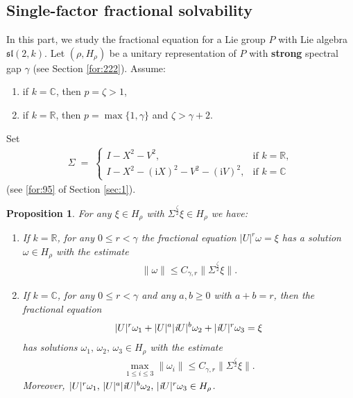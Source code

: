 \documentclass[11 pt]{amsart}
\newcommand{\RR}{\mathbb{R}}
\newcommand{\CC}{\mathbb{C}}
\newcommand{\norm}[1]{\lVert#1\rVert}
\newtheorem{proposition}[theorem]{Proposition}
\theoremstyle{definition}
\numberwithin{equation}{section}
\begin{document}
\subsection{Single-factor fractional solvability}
In this part, we study the fractional equation for a Lie group $P$ with Lie algebra $\mathfrak{sl}(2,k)$. Let $(\rho,H_\rho)$ be a unitary representation of $P$ with \textbf{strong} spectral gap $\gamma$ (see Section \ref{for:222}).  Assume:
\begin{enumerate}
  \item  if $k=\CC$, then $p=\zeta>1$,

   \item if $k=\RR$, then $p=\max\{1, \gamma\}$ and $\zeta>\gamma+2$.


\end{enumerate}
Set
\begin{align}\label{for:252}
 \Sigma\;=\;
  \begin{cases}
    I - X^2 - V^2, &
      \text{if } k = \RR,\\[4pt]
    I - X^2 - (\mathrm{i}X)^2 - V^2 - (\mathrm{i}V)^2, &
      \text{if } k= \CC
  \end{cases}
\end{align}
(see \eqref{for:95} of Section \ref{sec:1}).
\begin{proposition} \label{po:4}  For any $\xi\in H_\rho$ with $\Sigma^{\frac{\zeta}{2}}\xi\in H_\rho$ we have:
\begin{enumerate}
  \item If $k=\RR$, for any $0\leq r<\gamma$ the fractional equation $|U|^r\omega=\xi$ has a solution $\omega\in H_\rho$ with the estimate
  \begin{align*}
 \norm{\omega}\leq C_{\gamma,r}\big\|\Sigma^{\frac{\zeta}{2}}\xi\big\|.
\end{align*}
  \item If $k=\CC$, for any $0\leq r<\gamma$ and any $a,b\geq0$ with $a+b=r$, then the fractional equation
\begin{align*}
  |U|^{r}\omega_1+|U|^{a}|\emph{i} U|^{b}\omega_2+|\emph{i}U|^{r}\omega_3=\xi
  \end{align*}
  has solutions $\omega_1,\,\omega_2,\,\omega_3\in H_\rho$ with the estimate
  \begin{align*}
\max_{1\leq i\leq 3} \norm{\omega_i}\leq C_{\gamma,r}\big\|\Sigma^{\frac{\zeta}{2}}\xi\big\|.
\end{align*}
 Moreover, $|U|^{r}\omega_1,\,|U|^{a}|\emph{i} U|^{b}\omega_2,\,|\emph{i}U|^{r}\omega_3\in H_\rho$.



\end{enumerate}









\end{proposition}
\end{document}
